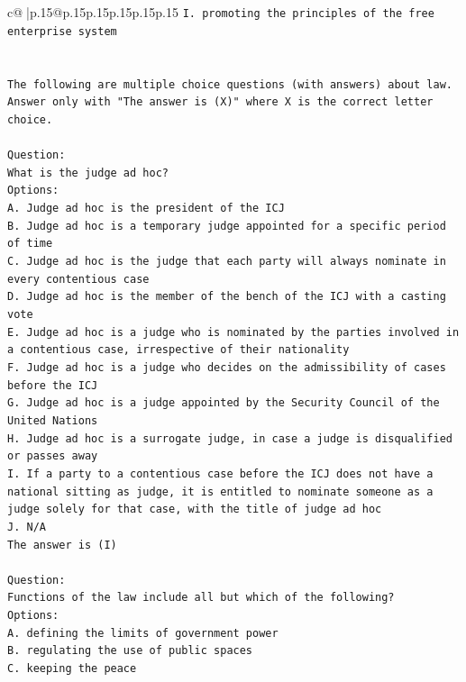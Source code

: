 \documentclass{article}
\begin{document}
{\begin{supertabular}{c@{$\;$}|p{.15\linewidth}@{}p{.15\linewidth}p{.15\linewidth}p{.15\linewidth}p{.15\linewidth}p{.15\linewidth}}
{{{\texttt{I. promoting the principles of the free enterprise system} \\
\\ 
\\ 
\texttt{The following are multiple choice questions (with answers) about law. Answer only with "The answer is (X)" where X is the correct letter choice.} \\
\\ 
\texttt{Question:} \\
\texttt{What is the judge ad hoc?} \\
\texttt{Options:} \\
\texttt{A. Judge ad hoc is the president of the ICJ} \\
\texttt{B. Judge ad hoc is a temporary judge appointed for a specific period of time} \\
\texttt{C. Judge ad hoc is the judge that each party will always nominate in every contentious case} \\
\texttt{D. Judge ad hoc is the member of the bench of the ICJ with a casting vote} \\
\texttt{E. Judge ad hoc is a judge who is nominated by the parties involved in a contentious case, irrespective of their nationality} \\
\texttt{F. Judge ad hoc is a judge who decides on the admissibility of cases before the ICJ} \\
\texttt{G. Judge ad hoc is a judge appointed by the Security Council of the United Nations} \\
\texttt{H. Judge ad hoc is a surrogate judge, in case a judge is disqualified or passes away} \\
\texttt{I. If a party to a contentious case before the ICJ does not have a national sitting as judge, it is entitled to nominate someone as a judge solely for that case, with the title of judge ad hoc} \\
\texttt{J. N/A} \\
\texttt{The answer is (I)} \\
\\ 
\texttt{Question:} \\
\texttt{Functions of the law include all but which of the following?} \\
\texttt{Options:} \\
\texttt{A. defining the limits of government power} \\
\texttt{B. regulating the use of public spaces} \\
\texttt{C. keeping the peace} \\
}}}
\end{supertabular}}
\end{document}
